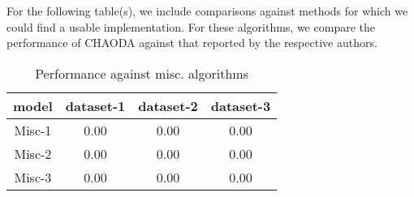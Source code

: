 For the following table(s), we include comparisons against methods for which we could find a usable implementation.
For these algorithms, we compare the performance of CHAODA against that reported by the respective authors.


\begin{table*}[!b]
\renewcommand{\arraystretch}{1.25}
\caption{Performance against misc. algorithms}
\label{table:results:misc-comparisons}
\begin{tabular}{|c|c|c|c|}
\hline
\textbf{model} & \textbf{dataset-1} & \textbf{dataset-2} & \textbf{dataset-3} \\
\hline
Misc-1 & 0.00 & 0.00 & 0.00 \\
\hline
Misc-2 & 0.00 & 0.00 & 0.00 \\
\hline
Misc-3 & 0.00 & 0.00 & 0.00 \\
\hline
\end{tabular}
\end{table*}






